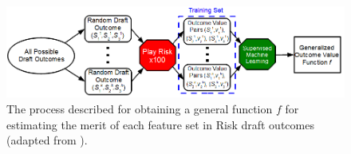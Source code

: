 \documentclass[letterpaper]{article}
\numberwithin{equation}{section}
\numberwithin{theorem}{section}
\numberwithin{lemma}{section}
\numberwithin{df}{section}
\begin{document}
%
%
%
%
\begin{figure}[t]
	\centering
	\includegraphics[scale=0.5]{../ForPublication/figs/MachineLearner.png}
	\caption{The process described for obtaining a general function $f$ for estimating the merit of each feature set in Risk draft outcomes (adapted from \cite[Figure 5.1]{GregLeeThesis}).}
	\label{fig:MachLearn}
\end{figure} 
%
\end{document}
